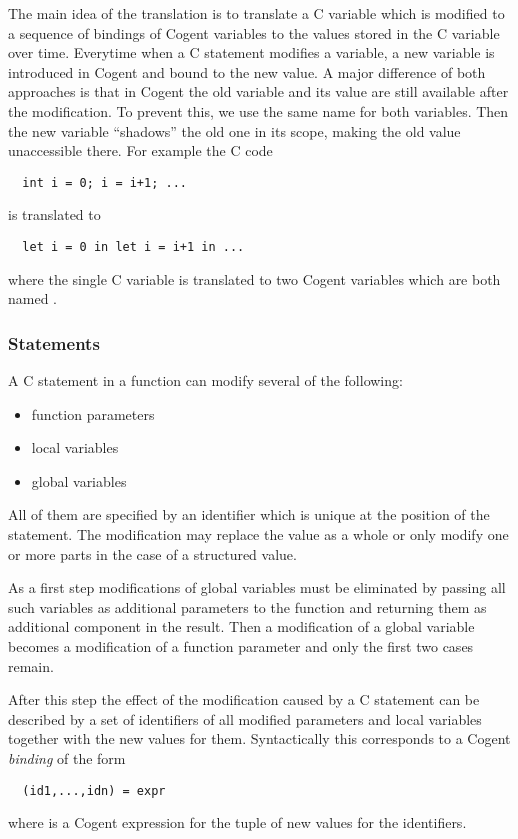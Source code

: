 The main idea of the translation is to translate a C variable which is modified to a sequence of bindings of Cogent
variables to the values stored in the C variable over time. Everytime when a C statement modifies a variable, a new
variable is introduced in Cogent and bound to the new value. A major difference of both approaches is that in Cogent 
the old variable and its value are still available after the modification. To prevent this, we use the same name for
both variables. Then the new variable ``shadows'' the old one in its scope, making the old value unaccessible there.
For example the C code
\begin{verbatim}
  int i = 0; i = i+1; ...
\end{verbatim}
is translated to
\begin{verbatim}
  let i = 0 in let i = i+1 in ...
\end{verbatim}
where the single C variable  is translated to two Cogent variables which are both named .

\subsubsection{Statements}

A C statement in a function can modify several of the following:
\begin{itemize}
\item function parameters
\item local variables
\item global variables
\end{itemize}
All of them are specified by an identifier which is unique at the position of the statement. The modification
may replace the value as a whole or only modify one or more parts in the case of a structured value.

As a first step modifications of global variables must be eliminated by passing all such variables as additional 
parameters to the function and returning them as additional component in the result. Then a modification of a
global variable becomes a modification of a function parameter and only the first two cases remain.

After this step the effect of the modification caused by a C statement can be described by a set of identifiers 
of all modified parameters and local variables together with the new values for them. Syntactically this corresponds
to a Cogent \textit{binding} of the form
\begin{verbatim}
  (id1,...,idn) = expr
\end{verbatim}
where  is a Cogent expression for the tuple of new values for the identifiers.

